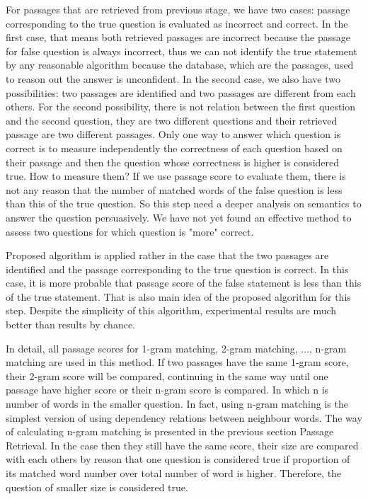 \documentclass[10pt,a4paper]{article}
\numberwithin{algorithm}{section}  %
\begin{document}
For passages that are retrieved from previous stage, we have two cases: passage corresponding to the true question is evaluated as incorrect and  correct. In the first case, that means both retrieved passages are incorrect because the passage for false question is always incorrect, thus we can not identify the true statement by any reasonable algorithm because the database, which are the passages, used to reason out the answer is unconfident. In the second case, we also have two possibilities: two passages are identified and two passages are different from each others. For the second possibility, there is not relation between the first question and the second question, they are two different questions and their retrieved passage are two different passages. Only one way to answer which question is correct is to measure independently the correctness of each question based on their passage and then the question whose correctness is higher is considered true. How to measure them? If we use passage score to evaluate them, there is not any reason that the number of matched words of the false question is less than this of the true question. So this step need a deeper analysis on semantics to answer the question persuasively. We have not yet found an effective method to assess two questions for which question is "more" correct.

Proposed algorithm is applied rather in the case that the two passages are identified and the passage corresponding to the true question is correct. In this case, it is more probable that passage score of the false statement is less than this of the true statement. That is also main idea of the proposed algorithm for this step. Despite the simplicity of this algorithm, experimental results are much better than results by chance.

In detail, all passage scores for 1-gram matching, 2-gram matching, ..., n-gram matching are used in this method. If two passages have the same 1-gram score, their 2-gram score will be compared, continuing in the same way until one passage have higher score or their n-gram score is compared. In which n is number of words in the smaller question. In fact, using n-gram matching is the simplest version of using dependency relations between neighbour words. The way of calculating n-gram matching is presented in the previous section Passage Retrieval. In the case then they still have the same score, their size are compared with each others by reason that one question is considered true if proportion of its matched word number over total number of word is higher. Therefore, the question of smaller size is considered true.
\end{document}
